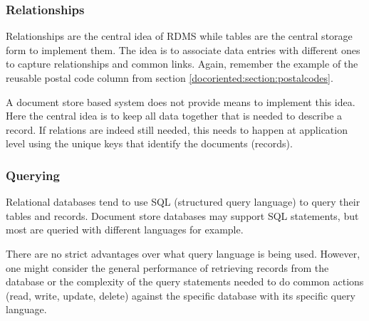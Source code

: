 \subsubsection{Relationships}
Relationships are the central idea of RDMS while tables are the central storage form to implement them. The idea is to associate data entries with different ones to capture relationships and common links. Again, remember the example of the reusable postal code column from section \ref{docoriented:section:postalcodes}.

A document store based system does not provide means to implement this idea. Here the central idea is to keep all data together that is needed to describe a record. If relations are indeed still needed, this needs to happen at application level \parencite{ian2016} using the unique keys that identify the documents (records).
\subsubsection{Querying}
Relational databases tend to use SQL (structured query language) to query their tables and records. Document store databases may support SQL statements, but most are queried with different languages   for example.

There are no strict advantages over what query language is being used. However, one might consider the general performance of retrieving records from the database or the complexity of the query statements needed to do common actions (read, write, update, delete) against the specific database with its specific query language.
